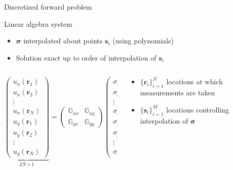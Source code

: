 \documentclass[presentation]{beamer}
\newcommand{\br}{\mathbf{r}}
\newcommand{\bs}{\mathbf{s}}
\begin{document}
\begin{frame}{Discretized forward problem}
 \small
\begin{block}{Linear algebra system}
\begin{itemize}
\item $\boldsymbol\sigma$ interpolated about points $\bs_i$ (using polynomials)
\item Solution exact up to order of interpolation of $\bs_i$
\end{itemize}
\begin{columns}
\begin{column}{0.6\textwidth}
\[
\underbrace{\left(\begin{matrix} 
u_{x}({\br_1} )\\
u_x({\br_2} ) \\
\vdots \\
u_x({\br_N} ) \\
u_{y}({\br_1} )\\
u_y({\br_2} ) \\
\vdots \\
u_y({\br_N} )
\end{matrix}\right)}_{2N\times1} =
\left(\begin{matrix}
\mathbb{G}_{xx} & \mathbb{G}_{xy} \\
\mathbb{G}_{yx} & \mathbb{G}_{yy}
\end{matrix}\right)
\underbrace{\left(\begin{matrix} 
\sigma_{xz}({\bs_1} )\\
\sigma_{xz}({\bs_2} ) \\
\vdots \\
\sigma_{xz}({\bs_M} ) \\
\sigma_{yz}({\bs_1} )\\
\sigma_{yz}({\bs_2} ) \\
\vdots \\
\sigma_{yz}({\bs_M} )
\end{matrix}\right)}_{2M\times1} 
\]
\end{column}
\begin{column}{0.4\textwidth}
\begin{itemize}
\item $\{\mathbf{r}_i\}_{i=1}^N$  locations at which measurements are taken
\item $\{\mathbf{s}_i\}_{i=1}^M$  locations controlling interpolation of $\boldsymbol\sigma$
\end{itemize}
\end{column}
\end{columns}
\end{block}
\end{frame}
\end{document}

